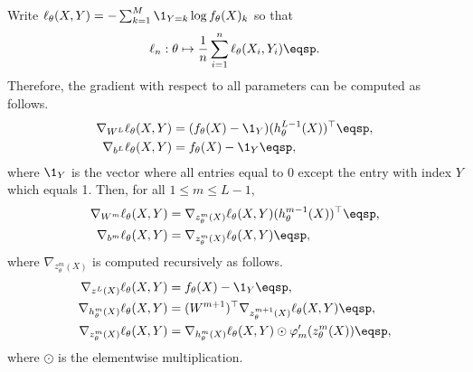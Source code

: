 \begin{shaded}
\begin{proposition}
\label{prop:backpropagation:classif}
Write $\ell_{\theta}(X,Y) =  -\sum_{k=1}^{M} \1_{Y=k}\log f_{\theta}(X)_k$ so that 
$$
\ell_n:\theta \mapsto \frac{1}{n} \sum_{i=1}^n \ell_{\theta}(X_i,Y_i)\eqsp. 
$$
Therefore, the gradient with respect to all parameters can be computed as follows.
\begin{align*}
\nabla_{W^L} \ell_{\theta}(X,Y) &= (f_{\theta}(X) - \1_Y)(h_{\theta}^{L-1}(X))^\top\eqsp,\\
\nabla_{b^L} \ell_{\theta}(X,Y) &= f_{\theta}(X) - \1_Y\eqsp,
\end{align*}
where $\1_Y$ is the vector where all entries equal to 0 except the entry with index $Y$ which equals 1. Then, for all $1\leqslant m\leqslant L-1$,
\begin{align*}
\nabla_{W^m} \ell_{\theta}(X,Y) &= \nabla_{z_{\theta}^m(X)}\ell_{\theta}(X,Y)(h_{\theta}^{m-1}(X))^\top\eqsp,\\
\nabla_{b^m} \ell_{\theta}(X,Y) &=  \nabla_{z_{\theta}^m(X)}\ell_{\theta}(X,Y)\eqsp,
\end{align*}
where $\nabla_{z_{\theta}^m(X)}$ is computed recursively as follows.
\begin{align*}
\nabla_{z^L(X)} \ell_{\theta}(X,Y) &= f_{\theta}(X) - \1_Y\eqsp,\\
\nabla_{h_{\theta}^m(X)} \ell_{\theta}(X,Y) &= (W^{m+1})^\top\nabla_{z_{\theta}^{m+1}(X)} \ell_{\theta}(X,Y) \eqsp,\\
\nabla_{z_{\theta}^m(X)} \ell_{\theta}(X,Y) &= \nabla_{h_{\theta}^m(X)}\ell_{\theta}(X,Y) \odot \varphi_m'(z_{\theta}^{m}(X))\eqsp,
\end{align*}
where $\odot$ is the elementwise multiplication.
\end{proposition}
\end{shaded}
